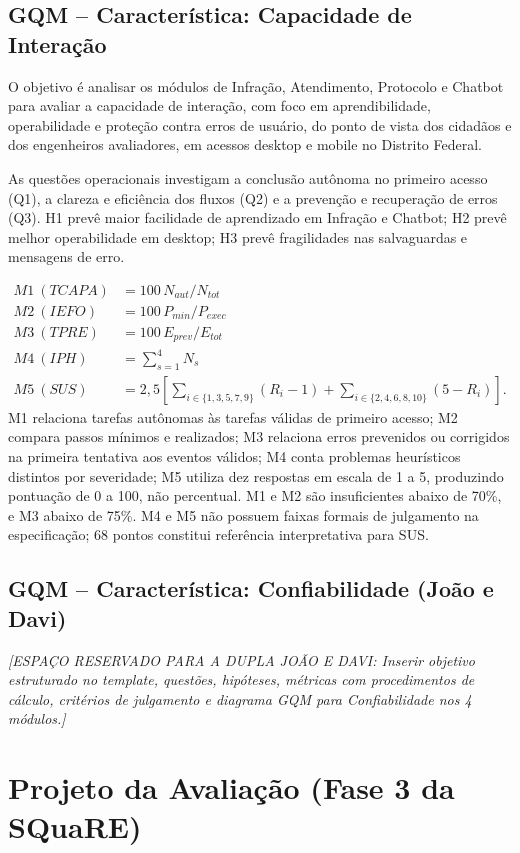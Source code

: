 \documentclass[12pt]{article}
\begin{document}
\subsection{GQM -- Característica: Capacidade de Interação}
O objetivo é analisar os módulos de Infração, Atendimento, Protocolo e Chatbot para avaliar a capacidade de interação, com foco em aprendibilidade, operabilidade e proteção contra erros de usuário, do ponto de vista dos cidadãos e dos engenheiros avaliadores, em acessos desktop e mobile no Distrito Federal.

As questões operacionais investigam a conclusão autônoma no primeiro acesso (Q1), a clareza e eficiência dos fluxos (Q2) e a prevenção e recuperação de erros (Q3). H1 prevê maior facilidade de aprendizado em Infração e Chatbot; H2 prevê melhor operabilidade em desktop; H3 prevê fragilidades nas salvaguardas e mensagens de erro.

\begin{align*}
M1\ (TCAPA)&=100\,N_{aut}/N_{tot}\\
M2\ (IEFO)&=100\,P_{min}/P_{exec}\\
M3\ (TPRE)&=100\,E_{prev}/E_{tot}\\
M4\ (IPH)&=\sum_{s=1}^{4}N_s\\
M5\ (SUS)&=2{,}5\left[\sum_{i\in\{1,3,5,7,9\}}(R_i-1)+\sum_{i\in\{2,4,6,8,10\}}(5-R_i)\right].
\end{align*}
M1 relaciona tarefas autônomas às tarefas válidas de primeiro acesso; M2 compara passos mínimos e realizados; M3 relaciona erros prevenidos ou corrigidos na primeira tentativa aos eventos válidos; M4 conta problemas heurísticos distintos por severidade; M5 utiliza dez respostas em escala de 1 a 5, produzindo pontuação de 0 a 100, não percentual. M1 e M2 são insuficientes abaixo de 70\%, e M3 abaixo de 75\%. M4 e M5 não possuem faixas formais de julgamento na especificação; 68 pontos constitui referência interpretativa para SUS.

\subsection{GQM -- Característica: Confiabilidade (João e Davi)}
\textit{[ESPAÇO RESERVADO PARA A DUPLA JOÃO E DAVI: Inserir objetivo estruturado no template, questões, hipóteses, métricas com procedimentos de cálculo, critérios de julgamento e diagrama GQM para Confiabilidade nos 4 módulos.]}

\section{Projeto da Avaliação (Fase 3 da SQuaRE)}
\end{document}
